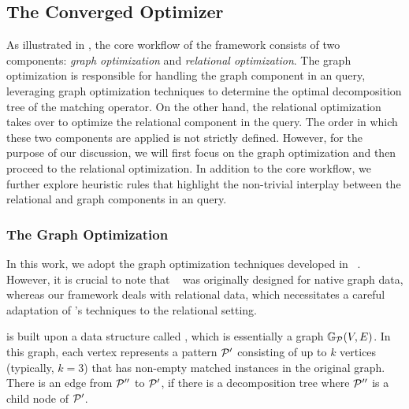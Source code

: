 \subsection{The Converged Optimizer}
\label{sec:converged}
As illustrated in , the core workflow of the \name framework consists of two components: \emph{graph optimization} and \emph{relational optimization}. The graph optimization is responsible for handling the graph component in an \spjm query, leveraging graph optimization techniques to determine the optimal decomposition tree of the matching operator. On the other hand, the relational optimization takes over to optimize the relational component in the query.
The order in which these two components are applied is not strictly defined. However, for the purpose of our discussion, we will first focus on the graph optimization and then proceed to the relational optimization.
In addition to the core workflow, we further explore heuristic rules that highlight the non-trivial interplay between the relational and graph components in an \spjm query.



\subsubsection{The Graph Optimization}
\label{sec:graph-optimizer}
In this work, we adopt the graph optimization techniques developed in \glogs~\cite{GLogS}. However, it is crucial to note that \glogs~ was originally designed for native graph data, whereas our framework deals with relational data, which necessitates a careful adaptation of \glogs's techniques to the relational setting.

 \glogs is built upon a data structure called \glogue, which is essentially a graph $\mathbb{G}_{\mathcal{P}}(V, E)$. In this graph, each vertex represents a pattern $\mathcal{P}'$ consisting of up to $k$ vertices (typically, $k=3$) that has non-empty matched instances in the original graph. There is an edge from $\mathcal{P}''$ to $\mathcal{P}'$, if there is a decomposition tree where $\mathcal{P}''$ is a child node of $\mathcal{P}'$.

